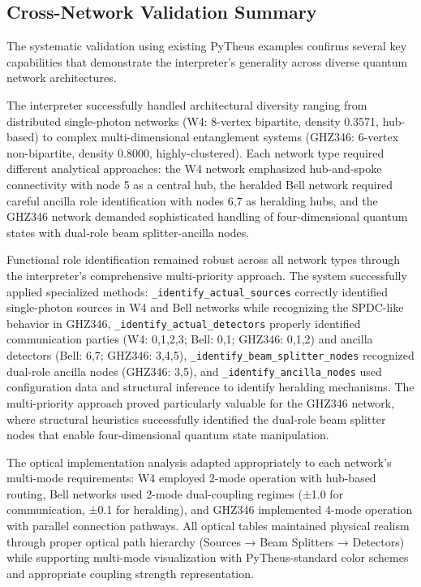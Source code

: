 \documentclass[11pt,a4paper]{article}
\begin{document}
\subsection{Cross-Network Validation Summary}

The systematic validation using existing PyTheus examples confirms several key capabilities that demonstrate the interpreter's generality across diverse quantum network architectures.

The interpreter successfully handled architectural diversity ranging from distributed single-photon networks (W4: 8-vertex bipartite, density 0.3571, hub-based) to complex multi-dimensional entanglement systems (GHZ346: 6-vertex non-bipartite, density 0.8000, highly-clustered). Each network type required different analytical approaches: the W4 network emphasized hub-and-spoke connectivity with node 5 as a central hub, the heralded Bell network required careful ancilla role identification with nodes 6,7 as heralding hubs, and the GHZ346 network demanded sophisticated handling of four-dimensional quantum states with dual-role beam splitter-ancilla nodes.

Functional role identification remained robust across all network types through the interpreter's comprehensive multi-priority approach. The system successfully applied specialized methods: \texttt{\_identify\_actual\_sources} correctly identified single-photon sources in W4 and Bell networks while recognizing the SPDC-like behavior in GHZ346, \texttt{\_identify\_actual\_detectors} properly identified communication parties (W4: 0,1,2,3; Bell: 0,1; GHZ346: 0,1,2) and ancilla detectors (Bell: 6,7; GHZ346: 3,4,5), \texttt{\_identify\_beam\_splitter\_nodes} recognized dual-role ancilla nodes (GHZ346: 3,5), and \texttt{\_identify\_ancilla\_nodes} used configuration data and structural inference to identify heralding mechanisms. The multi-priority approach proved particularly valuable for the GHZ346 network, where structural heuristics successfully identified the dual-role beam splitter nodes that enable four-dimensional quantum state manipulation.

The optical implementation analysis adapted appropriately to each network's multi-mode requirements: W4 employed 2-mode operation with hub-based routing, Bell networks used 2-mode dual-coupling regimes (±1.0 for communication, ±0.1 for heralding), and GHZ346 implemented 4-mode operation with parallel connection pathways. All optical tables maintained physical realism through proper optical path hierarchy (Sources → Beam Splitters → Detectors) while supporting multi-mode visualization with PyTheus-standard color schemes and appropriate coupling strength representation.
\end{document}

